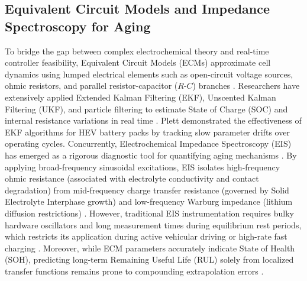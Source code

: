 \documentclass[pdflatex,sn-mathphys-num]{sn-jnl}%
\theoremstyle{thmstyleone}%
\theoremstyle{thmstyletwo}%
\theoremstyle{thmstylethree}%
\begin{document}
\subsection{Equivalent Circuit Models and Impedance Spectroscopy for Aging}\label{subsec:ecm_eis}
To bridge the gap between complex electrochemical theory and real-time controller feasibility, Equivalent Circuit Models (ECMs) approximate cell dynamics using lumped electrical elements such as open-circuit voltage sources, ohmic resistors, and parallel resistor-capacitor ($R$-$C$) branches \cite{ng2009enhanced,berecibar2016critical}. Researchers have extensively applied Extended Kalman Filtering (EKF), Unscented Kalman Filtering (UKF), and particle filtering to estimate State of Charge (SOC) and internal resistance variations in real time \cite{plett2004extended,richardson2017gaussian}. Plett \cite{plett2004extended} demonstrated the effectiveness of EKF algorithms for HEV battery packs by tracking slow parameter drifts over operating cycles. Concurrently, Electrochemical Impedance Spectroscopy (EIS) has emerged as a rigorous diagnostic tool for quantifying aging mechanisms \cite{keil2016calendar,galeotti2015performance}. By applying broad-frequency sinusoidal excitations, EIS isolates high-frequency ohmic resistance (associated with electrolyte conductivity and contact degradation) from mid-frequency charge transfer resistance (governed by Solid Electrolyte Interphase growth) and low-frequency Warburg impedance (lithium diffusion restrictions) \cite{stroe2016degradation,pastor2017comparison}. However, traditional EIS instrumentation requires bulky hardware oscillators and long measurement times during equilibrium rest periods, which restricts its application during active vehicular driving or high-rate fast charging \cite{greenbank2021automated}. Moreover, while ECM parameters accurately indicate State of Health (SOH), predicting long-term Remaining Useful Life (RUL) solely from localized transfer functions remains prone to compounding extrapolation errors \cite{chen2022prognostics}.
\end{document}

